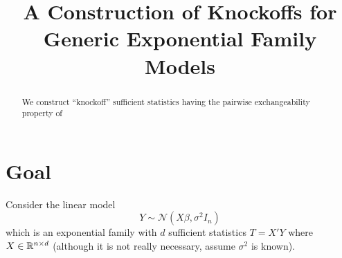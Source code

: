 \documentclass{article}
\begin{document}
\newtheorem{theorem}{Theorem}
\newtheorem{corollary}[theorem]{Corollary}
\newtheorem{lemma}[theorem]{Lemma}
\newtheorem{observation}[theorem]{Observation}
\newtheorem{proposition}[theorem]{Proposition}
\newtheorem{definition}[theorem]{Definition}
\newtheorem{claim}[theorem]{Claim}
\newtheorem{fact}[theorem]{Fact}
\newtheorem{assumption}[theorem]{Assumption}
\newtheorem{model}[theorem]{Model}

\theoremstyle{definition}
\newtheorem{example}{Example}

\newcommand{\cM}{\mathcal{M}}
\newcommand{\cN}{\mathcal{N}}
\newcommand{\cH}{\mathcal{H}}
\newcommand{\cD}{\mathcal{D}}
\newcommand{\FDR}{\textnormal{FDR}}
\newcommand{\FCR}{\textnormal{FCR}}
\newcommand{\crt}{\phi}
\newcommand{\M}{\mathcal{M}}
\newcommand{\cY}{\mathcal{Y}}
\newcommand{\cX}{\mathcal{X}}
\newcommand{\cV}{\mathcal{V}}
\newcommand{\bX}{\mathbf{X}}
\newcommand{\x}{\mathbf{x}}
\newcommand{\Gv}{\;\;\big|\;\;}
\newcommand{\proj}{\cP}
\newcommand{\pow}{\text{Pow}}
\newcommand{\sF}{\mathscr{F}}
\newcommand{\cF}{\mathcal{F}}
\newcommand{\sC}{\mathscr{C}}
\newcommand{\hJ}{\widehat{J}}
\newcommand{\bH}{\mathbf{H}}
\newcommand{\bM}{\mathbf{M}}
\newcommand{\hK}{\widehat{K}}
\newcommand{\leqAS}{\overset{\textrm{a.s.}}{\leq}}


\newcommand*\mystrut{\vrule width0pt height0pt depth1.5ex\relax}
\newcommand{\underlabel}{\underbracket[1pt][.5pt]{\mystrut \quad\;\; \sub \quad\;\; }}
\newcommand{\JTcomment}[1]{{\color{blue}{(JT: \bf \sc #1) }}}
\newcommand{\WFcomment}[1]{{\color{red}{(WF: \bf \sc #1) }}}

\title{A Construction of Knockoffs for Generic Exponential Family Models}
\maketitle

\begin{abstract}
  We construct ``knockoff'' sufficient statistics having the
  pairwise exchangeability property of \citet{barber2014controlling}
\end{abstract}

\section{Goal}

Consider the linear model
\begin{equation}
  Y \sim \cN(X\beta, \sigma^2I_n)
\end{equation}
which is an exponential family with $d$ sufficient statistics $T=X'Y$ where $X\in \mathbb{R}^{n\times d}$ (although it is not really necessary, assume $\sigma^2$ is known).
\end{document}
